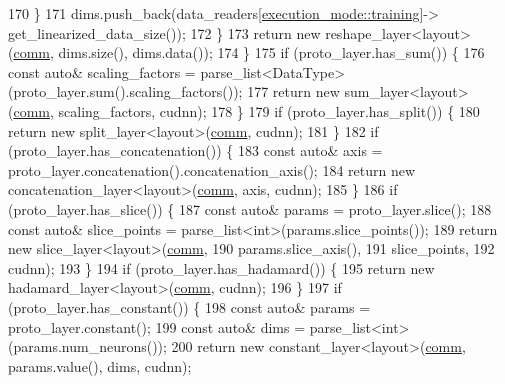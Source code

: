 \begin{DoxyCode}
170       \}
171       dims.push\_back(data\_readers[\hyperlink{base_8hpp_a2781a159088df64ed7d47cc91c4dc0a8ac185ddac8b5a8f5aa23c5b80bc12d214}{execution\_mode::training}]->
      get\_linearized\_data\_size());
172     \}
173     \textcolor{keywordflow}{return} \textcolor{keyword}{new} reshape\_layer<layout>(\hyperlink{file__io_8cpp_ab048c6f9fcbcfaa57ce68b00263dbebe}{comm}, dims.size(), dims.data());
174   \}
175   \textcolor{keywordflow}{if} (proto\_layer.has\_sum()) \{
176     \textcolor{keyword}{const} \textcolor{keyword}{auto}& scaling\_factors = parse\_list<DataType>(proto\_layer.sum().scaling\_factors());
177     \textcolor{keywordflow}{return} \textcolor{keyword}{new} sum\_layer<layout>(\hyperlink{file__io_8cpp_ab048c6f9fcbcfaa57ce68b00263dbebe}{comm}, scaling\_factors, cudnn);
178   \}
179   \textcolor{keywordflow}{if} (proto\_layer.has\_split()) \{
180     \textcolor{keywordflow}{return} \textcolor{keyword}{new} split\_layer<layout>(\hyperlink{file__io_8cpp_ab048c6f9fcbcfaa57ce68b00263dbebe}{comm}, cudnn);
181   \}
182   \textcolor{keywordflow}{if} (proto\_layer.has\_concatenation()) \{
183     \textcolor{keyword}{const} \textcolor{keyword}{auto}& axis = proto\_layer.concatenation().concatenation\_axis();
184     \textcolor{keywordflow}{return} \textcolor{keyword}{new} concatenation\_layer<layout>(\hyperlink{file__io_8cpp_ab048c6f9fcbcfaa57ce68b00263dbebe}{comm}, axis, cudnn);
185   \}
186   \textcolor{keywordflow}{if} (proto\_layer.has\_slice()) \{
187     \textcolor{keyword}{const} \textcolor{keyword}{auto}& params = proto\_layer.slice();
188     \textcolor{keyword}{const} \textcolor{keyword}{auto}& slice\_points = parse\_list<int>(params.slice\_points());
189     \textcolor{keywordflow}{return} \textcolor{keyword}{new} slice\_layer<layout>(\hyperlink{file__io_8cpp_ab048c6f9fcbcfaa57ce68b00263dbebe}{comm},
190                                    params.slice\_axis(),
191                                    slice\_points,
192                                    cudnn);
193   \}
194   \textcolor{keywordflow}{if} (proto\_layer.has\_hadamard()) \{
195     \textcolor{keywordflow}{return} \textcolor{keyword}{new} hadamard\_layer<layout>(\hyperlink{file__io_8cpp_ab048c6f9fcbcfaa57ce68b00263dbebe}{comm}, cudnn);
196   \}
197   \textcolor{keywordflow}{if} (proto\_layer.has\_constant()) \{
198     \textcolor{keyword}{const} \textcolor{keyword}{auto}& params = proto\_layer.constant();
199     \textcolor{keyword}{const} \textcolor{keyword}{auto}& dims = parse\_list<int>(params.num\_neurons());
200     \textcolor{keywordflow}{return} \textcolor{keyword}{new} constant\_layer<layout>(\hyperlink{file__io_8cpp_ab048c6f9fcbcfaa57ce68b00263dbebe}{comm}, params.value(), dims, cudnn);

\end{DoxyCode}
